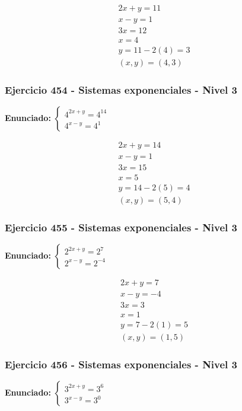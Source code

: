 \documentclass[12pt,a4paper]{article}
\begin{document}
\[
\begin{aligned}
2x+y=11\\
x-y=1\\
3x=12\\
x=4\\
y=11-2(4)=3\\
\boxed{(x,y)=(4,3)}
\end{aligned}
\]


\subsubsection*{Ejercicio 454 - Sistemas exponenciales - Nivel 3}
\textbf{Enunciado:} \(\begin{cases} 4^{2x+y}=4^{14}\\ 4^{x-y}=4^{1}\end{cases}\)

\[
\begin{aligned}
2x+y=14\\
x-y=1\\
3x=15\\
x=5\\
y=14-2(5)=4\\
\boxed{(x,y)=(5,4)}
\end{aligned}
\]


\subsubsection*{Ejercicio 455 - Sistemas exponenciales - Nivel 3}
\textbf{Enunciado:} \(\begin{cases} 2^{2x+y}=2^{7}\\ 2^{x-y}=2^{-4}\end{cases}\)

\[
\begin{aligned}
2x+y=7\\
x-y=-4\\
3x=3\\
x=1\\
y=7-2(1)=5\\
\boxed{(x,y)=(1,5)}
\end{aligned}
\]


\subsubsection*{Ejercicio 456 - Sistemas exponenciales - Nivel 3}
\textbf{Enunciado:} \(\begin{cases} 3^{2x+y}=3^{6}\\ 3^{x-y}=3^{0}\end{cases}\)
\end{document}
